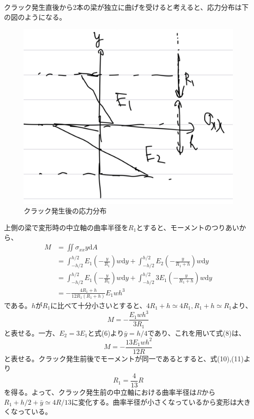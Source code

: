 \documentclass[a4paper]{jsarticle}
\begin{document}
\subsection{}
クラック発生直後から2本の梁が独立に曲げを受けると考えると、応力分布は下の図のようになる。
\begin{figure}[htb]
  \centering
  \includegraphics[width=0.3\hsize]{fig3.png}
  \caption{クラック発生後の応力分布}
\end{figure}
上側の梁で変形時の中立軸の曲率半径を$R_1$とすると、モーメントのつりあいから、
\begin{equation}
  \begin{aligned}
    M &= \iint \sigma_{xx} y \mathrm{d} A \\
    &= \int_{-h/2}^{h/2} E_1 \left(-\frac{y}{R_1}\right) w \mathrm{d} y
    + \int_{-h/2}^{h/2} E_2 \left(-\frac{y}{R_1 + h}\right) w \mathrm{d} y \\
    &= \int_{-h/2}^{h/2} E_1 \left(-\frac{y}{R_1}\right) w \mathrm{d} y
    + \int_{-h/2}^{h/2} 3 E_1 \left(-\frac{y}{R_1 + h}\right) w \mathrm{d} y \\
    &= -\frac{4 R_1 + h}{12 R_1 (R_1 + h)} E_1 w h^3
  \end{aligned}
\end{equation}
である。$h$が$R_1$に比べて十分小さいとすると、$4 R_1 + h \simeq 4 R_1, R_1 + h \simeq R_1$より、
\begin{equation}
  M = -\frac{E_1 w h^3}{3 R_1}
\end{equation}
と表せる。一方、$E_2 = 3 E_1$と式(6)より$\bar{y} = h/4$であり、これを用いて式(8)は、
\begin{equation}
  M = -\frac{13 E_1 w h^2}{12 R}
\end{equation}
と表せる。クラック発生前後でモーメントが同一であるとすると、式(10),(11)より
\begin{equation}
  R_1 = \frac{4}{13} R
\end{equation}
を得る。よって、クラック発生前の中立軸における曲率半径は$R$から$R_1 + h/2 + \bar{y} \simeq 4 R /13$に変化する。曲率半径が小さくなっているから変形は大きくなっている。
\end{document}
